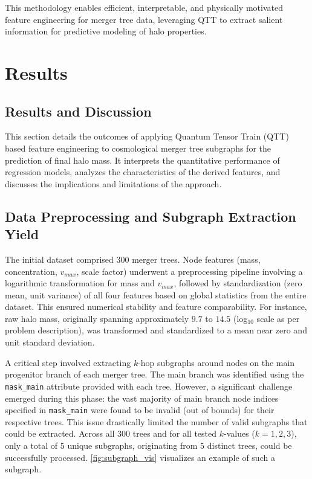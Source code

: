 \documentclass[twocolumn]{aastex631}
\begin{document}
This methodology enables efficient, interpretable, and physically motivated feature engineering for merger tree data, leveraging QTT to extract salient information for predictive modeling of halo properties.
\citep{16}\citep{17}\citep{18}\citep{30}

\section{Results}
\label{sec:results}
\subsection{Results and Discussion}

This section details the outcomes of applying Quantum Tensor Train (QTT) based feature engineering to cosmological merger tree subgraphs for the prediction of final halo mass. It interprets the quantitative performance of regression models, analyzes the characteristics of the derived features, and discusses the implications and limitations of the approach.

\subsection{Data Preprocessing and Subgraph Extraction Yield}

The initial dataset comprised 300 merger trees. Node features (mass, concentration, $v_{max}$, scale factor) underwent a preprocessing pipeline involving a logarithmic transformation for mass and $v_{max}$, followed by standardization (zero mean, unit variance) of all four features based on global statistics from the entire dataset. This ensured numerical stability and feature comparability. For instance, raw halo mass, originally spanning approximately $9.7$ to $14.5$ (log$_{10}$ scale as per problem description), was transformed and standardized to a mean near zero and unit standard deviation.

A critical step involved extracting $k$-hop subgraphs around nodes on the main progenitor branch of each merger tree. The main branch was identified using the \texttt{mask\_main} attribute provided with each tree. However, a significant challenge emerged during this phase: the vast majority of main branch node indices specified in \texttt{mask\_main} were found to be invalid (out of bounds) for their respective trees. This issue drastically limited the number of valid subgraphs that could be extracted. Across all 300 trees and for all tested $k$-values ($k=1, 2, 3$), only a total of 5 unique subgraphs, originating from 5 distinct trees, could be successfully processed. \autoref{fig:subgraph_vis} visualizes an example of such a subgraph.
\end{document}

